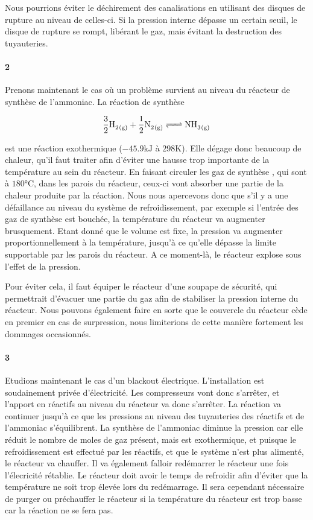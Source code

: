 Nous pourrions éviter le déchirement des canalisations en utilisant des disques de rupture 
au niveau de celles-ci. Si la pression interne dépasse un certain seuil, le disque de rupture 
se rompt, libérant le gaz, mais évitant la destruction des tuyauteries.

\paragraph{2} Prenons maintenant le cas où un problème survient au niveau du réacteur 
de synthèse de l'ammoniac. La réaction de synthèse

\begin{equation}
	\ce{\frac{3}{2} H2_{(g)} + \frac{1}{2} N2_{(g)} <=> NH3_{(g)}}
	\label{eq:synthesis}
\end{equation}

est une réaction exothermique ($-45.9\si{\kilo\joule}$ à $298\si{\kelvin}$). 
Elle dégage donc beaucoup de chaleur, qu'il faut traiter afin d'éviter 
une hausse trop importante de la température au sein du réacteur. 
En faisant circuler les gaz de synthèse ,  
qui sont à $180\si{\celsius}$, dans les parois du réacteur, 
ceux-ci vont absorber une partie de la chaleur produite par la réaction. 
Nous nous apercevons donc que s'il y a une défaillance au niveau du système 
de refroidissement, par exemple si l'entrée des gaz de synthèse est bouchée, 
la température du réacteur va augmenter brusquement. Etant donné que le volume est fixe, 
la pression va augmenter proportionnellement à la température, 
jusqu'à ce qu'elle dépasse la limite supportable par les parois du réacteur. 
A ce moment-là, le réacteur explose sous l'effet de la pression.

Pour éviter cela, il faut équiper le réacteur d'une soupape de sécurité, qui permettrait d'évacuer une partie du gaz afin de stabiliser la pression interne du réacteur. 
Nous pouvons également faire en sorte que le couvercle du réacteur cède en premier en cas de surpression, nous limiterions de cette manière fortement les dommages occasionnés.

\paragraph{3} Etudions maintenant le cas d'un blackout électrique. 
L'installation est soudainement privée d'électricité. 
Les compresseurs vont donc s'arrêter, et l'apport en réactifs au niveau 
du réacteur va donc s'arrêter.
La réaction va continuer jusqu'à ce que les pressions au niveau des tuyauteries 
des réactifs et de l'ammoniac s'équilibrent.
La synthèse de l'ammoniac diminue la pression car elle réduit le nombre de moles 
de gaz présent, mais est exothermique, et puisque le refroidissement est effectué 
par les réactifs, et que le système n'est plus alimenté, le réacteur va chauffer.
Il va également falloir redémarrer le réacteur une fois l'élecricité rétablie. 
Le réacteur doit avoir le temps de refroidir afin d'éviter 
que la température ne soit trop élevée lors du redémarrage. 
Il sera cependant nécessaire de purger ou préchauffer le réacteur si
la température du réacteur est trop basse car la réaction ne se fera pas.

